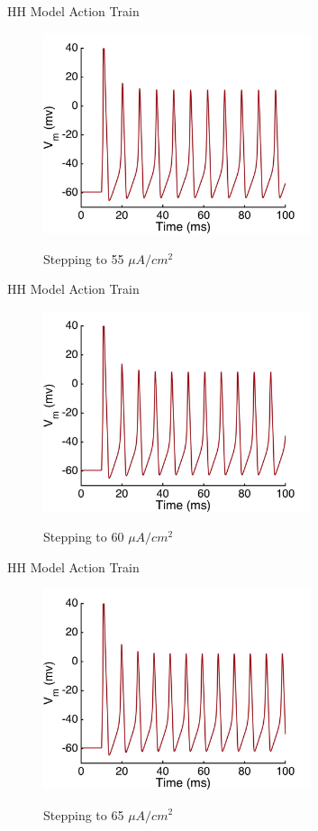 \documentclass{beamer}
\begin{document}
\begin{frame}{HH Model Action Train}
  \begin{figure}
    \centering
    \includegraphics[width = 0.7\textwidth]{./images/current_0_55.jpg}

    Stepping to 55 $\mu A/cm^2$
  \end{figure}
\end{frame}


\begin{frame}{HH Model Action Train}
  \begin{figure}
    \centering
    \includegraphics[width = 0.7\textwidth]{./images/current_0_60.jpg}

    Stepping to 60 $\mu A/cm^2$
  \end{figure}
\end{frame}


\begin{frame}{HH Model Action Train}
  \begin{figure}
    \centering
    \includegraphics[width = 0.7\textwidth]{./images/current_0_65.jpg}

    Stepping to 65 $\mu A/cm^2$
  \end{figure}
\end{frame}
\end{document}
